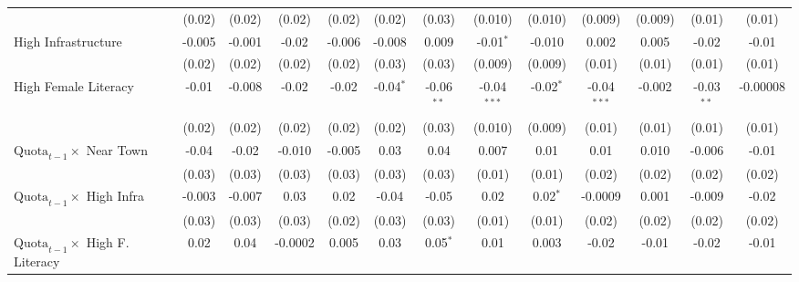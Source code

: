 \begin{adjustbox}{max width=\linewidth}
\begin{threeparttable}[b]
\begin{tabular}{lcccccccccccc}
                                                        & (0.02)       & (0.02)        & (0.02)       & (0.02)        & (0.02)       & (0.03)        & (0.010)       & (0.010)       & (0.009)       & (0.009)       & (0.01)       & (0.01)\\   
         High Infrastructure                            & -0.005       & -0.001        & -0.02        & -0.006        & -0.008       & 0.009         & -0.01$^{*}$   & -0.010        & 0.002         & 0.005         & -0.02        & -0.01\\   
                                                        & (0.02)       & (0.02)        & (0.02)       & (0.02)        & (0.03)       & (0.03)        & (0.009)       & (0.009)       & (0.01)        & (0.01)        & (0.01)       & (0.01)\\   
         High Female Literacy                           & -0.01        & -0.008        & -0.02        & -0.02         & -0.04$^{*}$  & -0.06$^{**}$  & -0.04$^{***}$ & -0.02$^{*}$   & -0.04$^{***}$ & -0.002        & -0.03$^{**}$ & -0.00008\\   
                                                        & (0.02)       & (0.02)        & (0.02)       & (0.02)        & (0.02)       & (0.03)        & (0.010)       & (0.009)       & (0.01)        & (0.01)        & (0.01)       & (0.01)\\   
         $\text{Quota}_{t-1} \times$ Near Town          & -0.04        & -0.02         & -0.010       & -0.005        & 0.03         & 0.04          & 0.007         & 0.01          & 0.01          & 0.010         & -0.006       & -0.01\\   
                                                        & (0.03)       & (0.03)        & (0.03)       & (0.03)        & (0.03)       & (0.03)        & (0.01)        & (0.01)        & (0.02)        & (0.02)        & (0.02)       & (0.02)\\   
         $\text{Quota}_{t-1} \times$ High Infra         & -0.003       & -0.007        & 0.03         & 0.02          & -0.04        & -0.05         & 0.02          & 0.02$^{*}$    & -0.0009       & 0.001         & -0.009       & -0.02\\   
                                                        & (0.03)       & (0.03)        & (0.03)       & (0.02)        & (0.03)       & (0.03)        & (0.01)        & (0.01)        & (0.02)        & (0.02)        & (0.02)       & (0.02)\\   
         $\text{Quota}_{t-1} \times$ High F. Literacy   & 0.02         & 0.04          & -0.0002      & 0.005         & 0.03         & 0.05$^{*}$    & 0.01          & 0.003         & -0.02         & -0.01         & -0.02        & -0.01\\   

\end{tabular}
\end{threeparttable}
\end{adjustbox}
